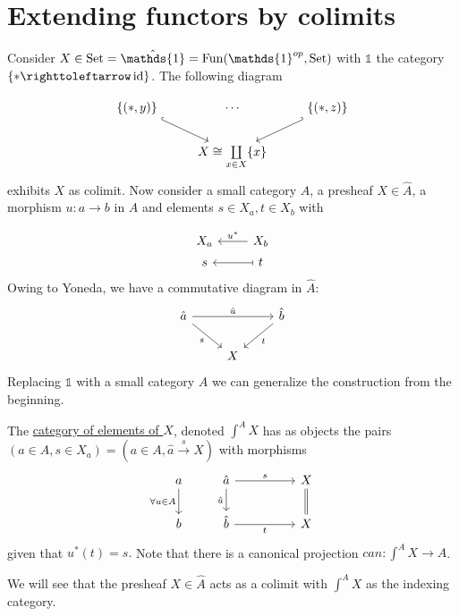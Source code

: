 \section{Extending functors by colimits}

Consider $X\in\Set = \hat{\mathds{1}}=\Fun(\mathds{1}^{op},\Set)$ with $\mathds{1}$  the category $\{\ast\righttoleftarrow \id\}$. The following diagram

\[\begin{tikzcd}
\{(\ast,y)\} \arrow[rd, hook] & \cdots                      & \{(\ast,z)\} \arrow[ld, hook'] \\
                 & X\cong\coprod\limits_{x\in X}\{x\} &                 
\end{tikzcd}\]
exhibits $X$ as colimit. Now consider a small category $A$, a presheaf $X\in \hat{A}$, a morphism $u\colon a \to b$ in $A$ and elements $s\in X_a, t\in X_b$ with

\[
    \begin{tikzcd}[row sep= 2pt]
    X_a & X_b \arrow[l, "u^*"'] \\
    s   & t \arrow[l, maps to] 
    \end{tikzcd}
\]
Owing to Yoneda, we have a commutative diagram in $\hat{A}$:
\[
\begin{tikzcd}
\hat{a} \arrow[rd, "s"'] \arrow[rr, "\hat{u}"] &   & \hat{b} \arrow[ld, "t"] \\
                                               & X &                        
\end{tikzcd}
\]
Replacing $\mathds{1}$ with a small category $A$ we can generalize the construction from the beginning.
\begin{defi}
    The \underline{category of elements of $X$}, denoted $\int^A X$ has as objects the pairs $(a\in A, s\in X_a)=(a\in A, \hat{a}\xrightarrow{s} X)$ with morphisms
    \[
        \begin{tikzcd}
        a \arrow[d, "\forall u\in A"'] & \hat{a} \arrow[rr, "s"] \arrow[d, "\hat{u}"'] && X \arrow[d, Rightarrow, no head] \\
        b                              & \hat{b} \arrow[rr, "t"']                      && X                               
        \end{tikzcd}
    \]
    given that $u^*(t)=s.$ Note that there is a canonical projection $can\colon \int^A X \to A$.
\end{defi}
We will see that the presheaf $X\in \hat{A}$ acts as a colimit with $\int^A X$ as the indexing category.

